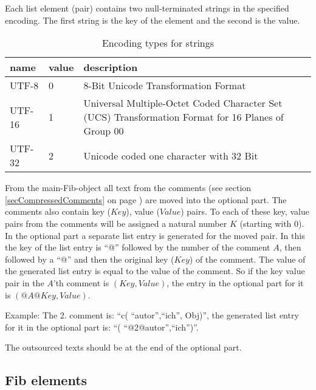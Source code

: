 Each list element (pair) contains two null-terminated strings in the specified encoding. The first string is the key of the element and the second is the value.

\begin{table}[htbp]
\begin{center}
\begin{tabular}{|p{20mm}|p{15mm}|p{80mm}|}\hline
	name & value & description \\\hline\hline
	UTF-8 & 0 & 8-Bit Unicode Transformation Format\\\hline
	UTF-16 & 1 & Universal Multiple-Octet Coded Character Set (UCS) Transformation Format for 16 Planes of Group 00\\\hline
	UTF-32 & 2 & Unicode coded one character with 32 Bit\\\hline

\end{tabular} 
\end{center}
\caption{Encoding types for strings}
\label{tableOptionalPartCoding}
\end{table}

\label{secCompressedOptionalPartComment}
From the main-Fib-object all text from the comments (see section \ref{secCompressedComments} on page \pageref{secCompressedComments}) are moved into the optional part. The comments also contain key ($Key$), value ($Value$) pairs. To each of these key, value pairs from the comments will be assigned a natural number $K$ (starting with 0). In the optional part a separate list entry is generated for the moved pair. In this the key of the list entry is ``@'' followed by the number of the comment $A$, then followed by a ``@'' and then the original key ($Key$) of the comment. The value of the generated list entry is equal to the value of the comment.
So if the key value pair in the $A$'th comment is $(Key, Value)$, the entry in the optional part for it is $(@A@Key, Value)$.

Example: The 2. comment is: ``c( ``autor'',``ich'', Obj)'', the generated list entry for it in the optional part is: ``( ``@2@autor'',``ich'')''.

The outsourced texts should be at the end of the optional part.



\subsection{Fib elements}
\label{secCompressedFibElement}

